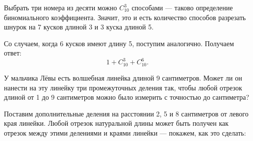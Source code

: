 \begin{itemize}
	Выбрать три номера из десяти можно $C_{10}^3$ способами — таково определение биномиального коэффициента. Значит, это и есть количество способов разрезать шнурок на 7 кусков длиной \SI{3}{} и 3 куска длиной \SI{5}{}.
	
	Со случаем, когда 6 кусков имеют длину 5, поступим аналогично. Получаем ответ:
	$$1 + C_{10}^3 + C_{10}^6.$$
	
	\itC У мальчика Лёвы есть волшебная линейка длиной 9 сантиметров. Может ли он нанести на эту линейку три промежуточных деления так, чтобы любой отрезок длиной от 1 до 9 сантиметров можно было измерить с точностью до сантиметра?
	
	\itr Поставим дополнительные деления на расстоянии 2, 5 и 8 сантиметров от левого края линейки. Любой отрезок натуральной длины может быть получен как отрезок между этими делениями и краями линейки — покажем, как это сделать:

	

\end{itemize}


